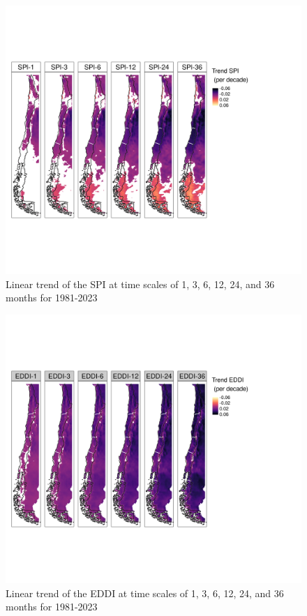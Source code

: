 \documentclass[
  number,
  preprint,
  3p,
  onecolumn]{elsarticle}
\begin{document}
\begin{figure}[!ht]

{\centering \includegraphics{../output/figs/trend_raster_SPI_1981-2023.png}

}

\caption{\label{fig-trendSPI}Linear trend of the SPI at time scales of
1, 3, 6, 12, 24, and 36 months for 1981-2023}

\end{figure}

\begin{figure}[!ht]

{\centering \includegraphics{../output/figs/trend_raster_EDDI_1981-2023.png}

}

\caption{\label{fig-trendEDDI}Linear trend of the EDDI at time scales of
1, 3, 6, 12, 24, and 36 months for 1981-2023}

\end{figure}
\end{document}
